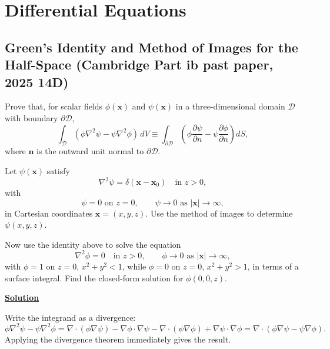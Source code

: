 \section{Differential Equations}
\subsection{Green's Identity and Method of Images for the Half-Space (Cambridge Part ib past paper, 2025 14D)}
\label{sec:greens-images}

Prove that, for scalar fields $\phi(\mathbf{x})$ and $\psi(\mathbf{x})$ in a
three-dimensional domain $\mathcal{D}$ with boundary $\partial\mathcal{D}$,
\begin{equation}
  \int_{\mathcal{D}}(\phi\nabla^2\psi - \psi\nabla^2\phi)\,dV
  \equiv \int_{\partial\mathcal{D}}
  \!\left(\phi\frac{\partial\psi}{\partial n} - \psi\frac{\partial\phi}{\partial n}\right)dS,
\end{equation}
where $\mathbf{n}$ is the outward unit normal to $\partial\mathcal{D}$.

Let $\psi(\mathbf{x})$ satisfy
\begin{equation}
  \nabla^2\psi = \delta(\mathbf{x}-\mathbf{x}_0) \quad \text{in } z>0,
\end{equation}
with
\begin{equation}
  \psi = 0 \text{ on } z=0, \qquad \psi\to 0 \text{ as } |\mathbf{x}|\to\infty,
\end{equation}
in Cartesian coordinates $\mathbf{x}=(x,y,z)$. Use the method of images to
determine $\psi(x,y,z)$.

Now use the identity above to solve the equation
\begin{equation}
  \nabla^2\phi = 0 \quad \text{in } z>0, \qquad \phi\to 0 \text{ as }
  |\mathbf{x}|\to\infty,
\end{equation}
with $\phi=1$ on $z=0$, $x^2+y^2<1$, while $\phi=0$ on $z=0$,
$x^2+y^2>1$, in terms of a surface integral. Find the closed-form
solution for $\phi(0,0,z)$.

\noindent\underline{\textbf{Solution}}

Write the integrand as a divergence:
\begin{equation}
  \phi\nabla^2\psi - \psi\nabla^2\phi
  = \nabla\cdot(\phi\nabla\psi) - \nabla\phi\cdot\nabla\psi
  - \nabla\cdot(\psi\nabla\phi) + \nabla\psi\cdot\nabla\phi
  = \nabla\cdot(\phi\nabla\psi - \psi\nabla\phi).
\end{equation}
Applying the divergence theorem immediately gives the result. 

